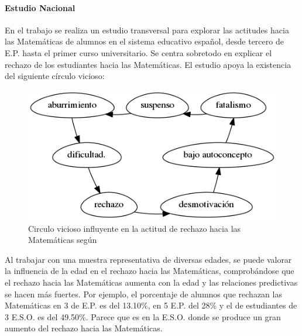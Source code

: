 \paragraph{Estudio Nacional}

En el trabajo \cite{ActitudesHaciaMates} se realiza un estudio transversal para explorar las actitudes hacia las Matemáticas de alumnos en el sistema educativo español, desde tercero de E.P. hasta el primer curso universitario. 
%
Se centra sobretodo en explicar el rechazo de los estudiantes hacia las Matemáticas.
%
El estudio apoya la existencia del siguiente círculo vicioso: 



\begin{figure}[hbt]
\centering
\includegraphics[scale=0.57]{img/circuloVicioso.png}
\caption{Circulo vicioso influyente en la actitud de rechazo hacia las Matemáticas según \cite{ActitudesHaciaMates}}
\label{fig::circuloVicioso}
\end{figure}
\FloatBarrier




Al trabajar con una muestra representativa de diversas edades, se puede valorar la influencia de la edad en el rechazo hacia las Matemáticas, comprobándose que el rechazo hacia las Matemáticas aumenta con la edad y las relaciones predictivas se hacen más fuertes.
%
Por ejemplo, el porcentaje de alumnos que rechazan las Matemáticas en 3 de E.P. es del 13.10\%, en 5 E.P. del 28\%  y el de estudiantes de 3 E.S.O. es del 49.50\%.
%
Parece que es en la E.S.O. donde se produce un gran aumento del rechazo hacia las Matemáticas.


